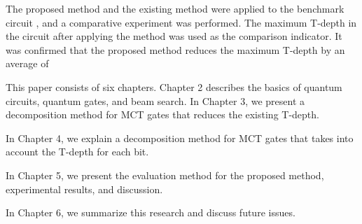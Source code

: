\par
The proposed method and the existing method \cite{abdessaied2016technology,niemann2019t,baker2019decomposing}
were applied to the benchmark circuit \cite{wille2008revlib}, and a comparative experiment was performed.
The maximum T-depth in the circuit after applying the method was used as the comparison indicator.
It was confirmed that the proposed method reduces the maximum T-depth by an average of %
\par
This paper consists of six chapters.
Chapter 2 describes the basics of quantum circuits, quantum gates, and beam search.
In Chapter 3, we present a decomposition method for MCT gates that reduces the existing T-depth.

In Chapter 4, we explain a decomposition method for MCT gates that takes into account the T-depth for each bit.

In Chapter 5, we present the evaluation method for the proposed method, experimental results, and discussion.

In Chapter 6, we summarize this research and discuss future issues.

